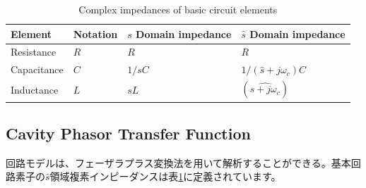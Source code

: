 \documentclass[book]{jlreq}
\begin{document}
\begin{table}[hbt]
    \caption{Complex impedances of basic circuit elements}
    \label{Table3.2}
    \centering
    \begin{tabular}{l|l|l|l} \hline
        Element & Notation & $s$ Domain impedance & $\hat{s}$ Domain impedance \\ \hline \hline
        Resistance & $R$ & $R$ & $R$ \\ \hline
        Capacitance & $C$ & $1/sC$ & $1/(\hat{s}+j\omega_c) C$\\ \hline
        Inductance & $L$ & $sL$ & $(\hat{s+j\omega_c})$ \\ \hline
    \end{tabular}
\end{table}

\subsection{Cavity Phasor Transfer Function}

回路モデルは、フェーザラプラス変換法を用いて解析することができる。基本回路素子の$\hat{s}$領域複素インピーダンスは表\ref{Table3.2}に定義されています。
\end{document}
